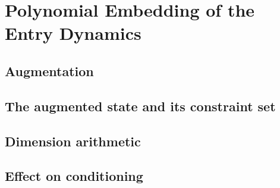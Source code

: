
\section{Polynomial Embedding of the Entry Dynamics}
\label{apx:embedding}

\subsection{Augmentation}
\label{sub:apx_augmentation}

\subsection{The augmented state and its constraint set}
\label{sub:apx_augmented_state}

\subsection{Dimension arithmetic}
\label{sub:apx_dimension_arithmetic}

\subsection{Effect on conditioning}
\label{sub:apx_augmentation_conditioning}
